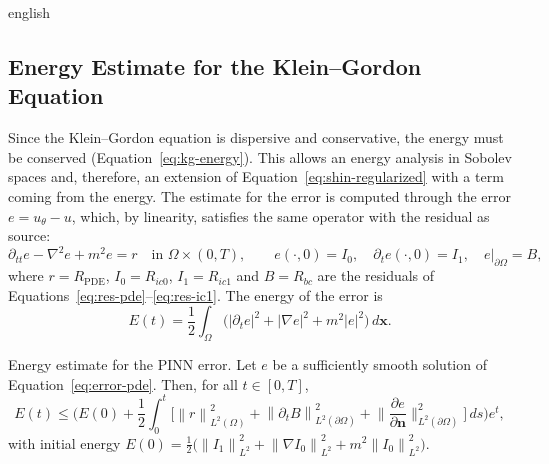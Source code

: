 \documentclass[12pt,letterpaper,twoside]{book}
\newcommand{\norm}[1]{\left\lVert #1 \right\rVert}
\newcommand{\abs}[1]{\left\lvert #1 \right\rvert}
\begin{document}
\begin{hyphenrules}{english}
\subsection{Energy Estimate for the Klein--Gordon Equation}\label{subsec:energy-estimate}\label{sec:energy-estimate}

Since the Klein--Gordon equation is dispersive and conservative, the energy must be conserved
(Equation~\eqref{eq:kg-energy}). This allows an energy analysis in Sobolev spaces and, therefore, an extension
of Equation~\eqref{eq:shin-regularized} with a term coming from the energy. The estimate for the error is computed
through the error $e=u_\theta-u$, which, by linearity, satisfies the same operator with the residual as
source:
\begin{equation}
  \partial_{tt}e-\nabla^2e+m^2e=r\quad\text{in }\Omega\times(0,T),\qquad
  e(\cdot,0)=I_0,\quad\partial_te(\cdot,0)=I_1,\quad e|_{\partial\Omega}=B,
  \label{eq:error-pde}
\end{equation}
where $r=R_{\mathrm{PDE}}$, $I_0=R_{ic0}$, $I_1=R_{ic1}$ and $B=R_{bc}$ are the residuals of
Equations~\eqref{eq:res-pde}--\eqref{eq:res-ic1}. The energy of the error is
\begin{equation}
  E(t)=\frac12\int_\Omega\Big(\abs{\partial_te}^2+\abs{\nabla e}^2+m^2\abs{e}^2\Big)\,d\mathbf{x}.
  \label{eq:error-energy}
\end{equation}

\begin{teorema}{Energy estimate for the PINN error.}\label{thm:energy-estimate}
Let $e$ be a sufficiently smooth solution of Equation~\eqref{eq:error-pde}. Then, for all $t\in[0,T]$,
\begin{equation}
  E(t)\le\Big(E(0)+\frac12\int_0^t\Big[\norm{r}^2_{L^2(\Omega)}+\norm{\partial_tB}^2_{L^2(\partial\Omega)}
  +\Big\|\frac{\partial e}{\partial\mathbf{n}}\Big\|^2_{L^2(\partial\Omega)}\Big]\,d s\Big)e^{t},
  \label{eq:energy-bound}
\end{equation}
with initial energy
$E(0)=\frac12\big(\norm{I_1}^2_{L^2}+\norm{\nabla I_0}^2_{L^2}+m^2\norm{I_0}^2_{L^2}\big)$.
\end{teorema}


\end{hyphenrules}
\end{document}
